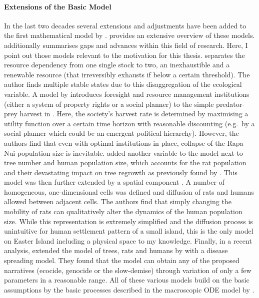 \paragraph{Extensions of the Basic Model}
In the last two decades several extensions and adjustments have been added to the first mathematical model by \citet{Brander1998}.
\citet{Reuveny2012} provides an extensive overview of these models.
\citet{Merico2017} additionally summarises gaps and advances within this field of research. 
Here, I point out those models relevant to the motivation for this thesis.
\citet{dAlessandro2007} separates the resource dependency from one single stock to two, an inexhaustible and a renewable resource (that irreversibly exhausts if below a certain threshold).
The author finds multiple stable states due to this disaggregation of the ecological variable. 
A model by \citet{Good2006} introduces foresight and resource management institutions (either a system of property rights or a social planner) to the simple predator-prey harvest in \citet{Brander1998}.
Here, the society's harvest rate is determined by maximising a utility function over a certain time horizon with reasonable discounting (e.g.\ by a social planner which could be an emergent political hierarchy).
However, the authors find that even with optimal institutions in place, collapse of the Rapa Nui population size is inevitable.
\citet{Basener2008} added another variable to the model next to tree number and human population size, which accounts for the rat population and their devastating impact on tree regrowth as previously found by \citet{Hunt2007}. 
This model was then further extended by a spatial component \citep{Basener2011}. 
A number of homogeneous, one-dimensional cells was defined and diffusion of rats and humans allowed between adjacent cells. 
The authors find that simply changing the mobility of rats can qualitatively alter the dynamics of the human population size.
While this representation is extremely simplified and the diffusion process is unintuitive for human settlement pattern of a small island, this is the only model on Easter Island including a physical space to my knowledge.
Finally, in a recent analysis, \citet{Brandt2015} extended the model of trees, rats and humans by \citet{Basener2008} with a disease spreading model.
They found that the model can obtain any of the proposed narratives (ecocide, genocide or the slow-demise) through variation of only a few parameters in a reasonable range.
All of these various models build on the basic assumptions by the basic processes described in the macroscopic ODE model by \citet{Brander1998}.


